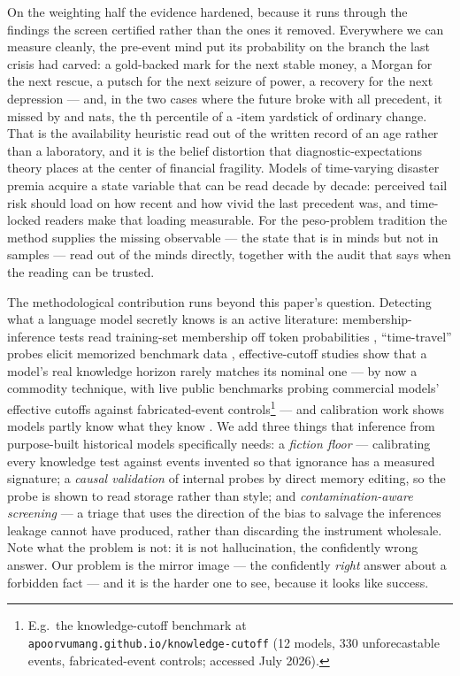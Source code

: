 \documentclass[11pt]{article}
\begin{document}
On the weighting half the evidence hardened, because it runs through the findings the screen certified
rather than the ones it removed. Everywhere we can measure cleanly, the pre-event mind put its probability
on the branch the last crisis had carved: a gold-backed mark for the next stable money, a Morgan for the
next rescue, a putsch for the next seizure of power, a recovery for the next depression --- and, in the
two cases where the future broke with all precedent, it missed by \NkaiserGap{} and \NinflendGap{} nats,
the \NkaiserMundanePct th percentile of a \NmundaneN-item yardstick of ordinary change. That is the
availability heuristic
\citep{tversky1973} read out of the written record of an age rather than a laboratory, and it is the
belief distortion that diagnostic-expectations theory \citep{bordalo2018,gennaioli2018} places at the
center of financial fragility. Models of time-varying disaster premia \citep{gabaix2012,wachter2013}
acquire a state variable that can be read decade by decade: perceived tail risk should load on how recent
and how vivid the last precedent was, and time-locked readers make that loading measurable. For the
peso-problem tradition \citep{krasker1980} the method supplies the missing observable --- the state that
is in minds but not in samples --- read out of the minds directly, together with the audit that says when
the reading can be trusted.

The methodological contribution runs beyond this paper's question. Detecting what a language model
secretly knows is an active literature: membership-inference tests read training-set membership off token
probabilities \citep{shi2024}, ``time-travel'' probes elicit memorized benchmark data \citep{golchin2024},
effective-cutoff studies show that a model's real knowledge horizon rarely matches its nominal one
\citep{cheng2024} --- by now a commodity technique, with live public benchmarks probing commercial
models' effective cutoffs against fabricated-event controls\footnote{E.g.\ the knowledge-cutoff
benchmark at \texttt{apoorvumang.github.io/knowledge-cutoff} (12 models, 330 unforecastable events,
fabricated-event controls; accessed July 2026).} --- and calibration work shows models partly know
what they know \citep{kadavath2022}. We
add three things that inference from purpose-built historical models specifically needs: a
\emph{fiction floor} --- calibrating every knowledge test against events invented so that ignorance has a
measured signature; a \emph{causal validation} of internal probes by direct memory editing, so the probe
is shown to read storage rather than style; and \emph{contamination-aware screening} --- a triage that
uses the direction of the bias to salvage the inferences leakage cannot have produced, rather than
discarding the instrument wholesale. Note what the problem is not: it is not hallucination, the
confidently wrong answer. Our problem is the mirror image --- the confidently \emph{right} answer about a
forbidden fact --- and it is the harder one to see, because it looks like success.
\end{document}
